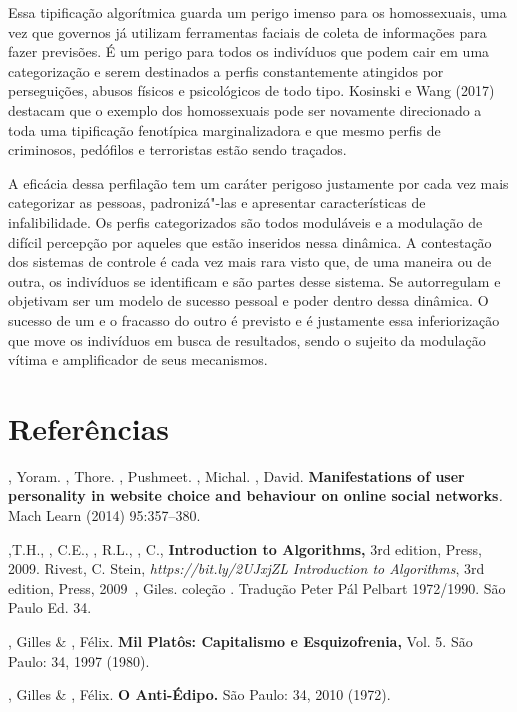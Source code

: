 Essa tipificação algorítmica guarda um perigo imenso para os
homossexuais, uma vez que governos já utilizam ferramentas faciais de
coleta de informações para fazer previsões. É um perigo para todos os
indivíduos que podem cair em uma categorização e serem destinados a
perfis constantemente atingidos por perseguições, abusos físicos e
psicológicos de todo tipo. Kosinski e Wang (2017) destacam que o exemplo
dos homossexuais pode ser novamente direcionado a toda uma tipificação
fenotípica marginalizadora e que mesmo perfis de criminosos, pedófilos e
terroristas estão sendo traçados.

A eficácia dessa perfilação tem um caráter perigoso justamente por cada
vez mais categorizar as pessoas, padronizá"-las e apresentar
características de infalibilidade. Os perfis categorizados são todos
moduláveis e a modulação de difícil percepção por aqueles que estão
inseridos nessa dinâmica. A contestação dos sistemas de controle é cada
vez mais rara visto que, de uma maneira ou de outra, os indivíduos se
identificam e são partes desse sistema. Se autorregulam e objetivam ser
um modelo de sucesso pessoal e poder dentro dessa dinâmica. O sucesso de
um e o fracasso do outro é previsto e é justamente essa inferiorização
que move os indivíduos em busca de resultados, sendo o sujeito da
modulação vítima e amplificador de seus mecanismos.

\section{Referências}

, Yoram. , Thore. , Pushmeet. , Michal.
, David. \textbf{Manifestations of user personality in website
choice and behaviour on online social networks}\emph{.} Mach Learn
(2014) 95:357--380.

,T.H., , C.E., , R.L., , C.,
\textbf{Introduction to Algorithms,} 3rd edition,  Press, 2009.
Rivest, C. Stein, \emph{https://bit.ly/2UJxjZL} {\emph{Introduction
to Algorithms}}, 3rd edition,  Press, 2009~, Giles.
\textbf{} coleção . Tradução Peter Pál Pelbart
1972/1990. São Paulo Ed. 34.

, Gilles \& , Félix. \textbf{Mil Platôs: Capitalismo e
Esquizofrenia,} Vol. 5. São Paulo: 34, 1997 (1980).

, Gilles \& , Félix. \textbf{O Anti-Édipo.} São Paulo:
34, 2010 (1972).


